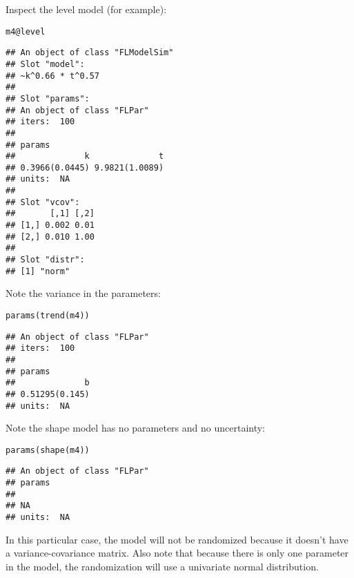 \documentclass[a4paper,english,10pt]{article}\usepackage[]{graphicx}\usepackage[]{color}
\makeatletter
\newcommand{\hlopt}[1]{\textcolor[rgb]{0.196,0.196,0.196}{#1}}%
\newcommand{\hlstd}[1]{\textcolor[rgb]{0.196,0.196,0.196}{#1}}%
\newcommand{\hlkwc}[1]{\textcolor[rgb]{0,0.631,0.314}{#1}}%
\newcommand{\hlkwd}[1]{\textcolor[rgb]{0.78,0.227,0.412}{#1}}%
\newenvironment{kframe}{%
 \def\at@end@of@kframe{}%
 \ifinner\ifhmode%
  \def\at@end@of@kframe{\end{minipage}}%
  \begin{minipage}{\columnwidth}%
 \fi\fi%
 \def\FrameCommand##1{\hskip\@totalleftmargin \hskip-\fboxsep
 \colorbox{shadecolor}{##1}\hskip-\fboxsep
     \hskip-\linewidth \hskip-\@totalleftmargin \hskip\columnwidth}%
 \MakeFramed {\advance\hsize-\width
   \@totalleftmargin\z@ \linewidth\hsize
   \@setminipage}}%
 {\par\unskip\endMakeFramed%
 \at@end@of@kframe}
\newenvironment{knitrout}{}{} %
\makeatother
\begin{document}
Inspect the level model (for example):

\begin{knitrout}
\color{fgcolor}\begin{kframe}
\begin{alltt}
\hlstd{m4}\hlopt{@}\hlkwc{level}
\end{alltt}
\begin{verbatim}
## An object of class "FLModelSim"
## Slot "model":
## ~k^0.66 * t^0.57
## 
## Slot "params":
## An object of class "FLPar"
## iters:  100 
## 
## params
##              k              t 
## 0.3966(0.0445) 9.9821(1.0089) 
## units:  NA 
## 
## Slot "vcov":
##       [,1] [,2]
## [1,] 0.002 0.01
## [2,] 0.010 1.00
## 
## Slot "distr":
## [1] "norm"
\end{verbatim}
\end{kframe}
\end{knitrout}

Note the variance in the parameters: 

\begin{knitrout}
\color{fgcolor}\begin{kframe}
\begin{alltt}
\hlkwd{params}\hlstd{(}\hlkwd{trend}\hlstd{(m4))}
\end{alltt}
\begin{verbatim}
## An object of class "FLPar"
## iters:  100 
## 
## params
##              b 
## 0.51295(0.145) 
## units:  NA
\end{verbatim}
\end{kframe}
\end{knitrout}

Note the shape model has no parameters and no uncertainty:

\begin{knitrout}
\color{fgcolor}\begin{kframe}
\begin{alltt}
\hlkwd{params}\hlstd{(}\hlkwd{shape}\hlstd{(m4))}
\end{alltt}
\begin{verbatim}
## An object of class "FLPar"
## params
##    
## NA 
## units:  NA
\end{verbatim}
\end{kframe}
\end{knitrout}

In this particular case, the  model will not be randomized because it doesn't have a variance-covariance matrix. Also note that because there is only one parameter in the  model, the randomization will use a univariate normal distribution.
\end{document}
